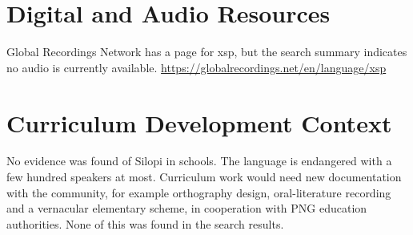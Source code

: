\documentclass[12pt]{article}
\begin{document}
\section{Digital and Audio Resources}
Global Recordings Network has a page for xsp, but the search summary indicates no audio is currently available. \url{https://globalrecordings.net/en/language/xsp}

\section{Curriculum Development Context}
No evidence was found of Silopi in schools. The language is endangered with a few hundred speakers at most. Curriculum work would need new documentation with the community, for example orthography design, oral-literature recording and a vernacular elementary scheme, in cooperation with PNG education authorities. None of this was found in the search results.
\end{document}
